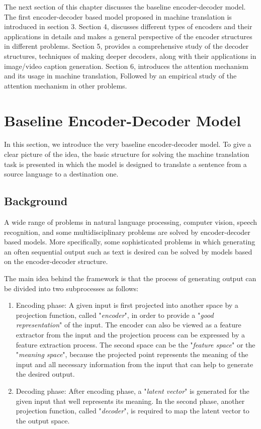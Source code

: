 \documentclass[preprint, 10pt]{elsarticle}
\begin{document}
	The next section of this chapter discusses the baseline encoder-decoder model. The first encoder-decoder based model proposed in machine translation is introduced in section 3. Section 4, discusses different types of encoders and their applications in details and makes a general perspective of the encoder structures in different problems. Section 5, provides a comprehensive study of the decoder structures, techniques of making deeper decoders, along with their applications in image/video caption generation. Section 6, introduces the attention mechanism and its usage in machine translation, Followed by an empirical study of the attention mechanism in other problems.
	
	\section{Baseline Encoder-Decoder Model}
	In this section, we introduce the very baseline encoder-decoder model. To give a clear picture of the idea, the basic structure for solving the machine translation task is presented in which the model is designed to translate a sentence from a source language to a destination one.  
		\subsection{Background}
		A wide range of problems in natural language processing, computer vision, speech recognition, and some multidisciplinary problems are solved by encoder-decoder based models. More specifically, some sophisticated problems in which generating an often sequential output such as text is desired can be solved by models based on the encoder-decoder structure. 
		
		The main idea behind the framework is that the process of generating output can be divided into two subprocesses as follows:
		\begin{enumerate}
			\item Encoding phase: A given input is first projected into another space by a projection function, called "\textit{encoder}", in order to provide a "\textit{good representation}" of the input. The encoder can also be viewed as a feature extractor from the input and the projection process can be expressed by a feature extraction process. The second space can be the "\textit{feature space}" or the "\textit{meaning space}", because the projected point represents the meaning of the input and all necessary information from the input that can help to generate the desired output.
			\item Decoding phase: After encoding phase, a "\textit{latent vector}" is generated for the given input that well represents its meaning. In the second phase, another projection function, called "\textit{decoder}", is required to map the latent vector to the output space.
		\end{enumerate} 
	
\end{document}
